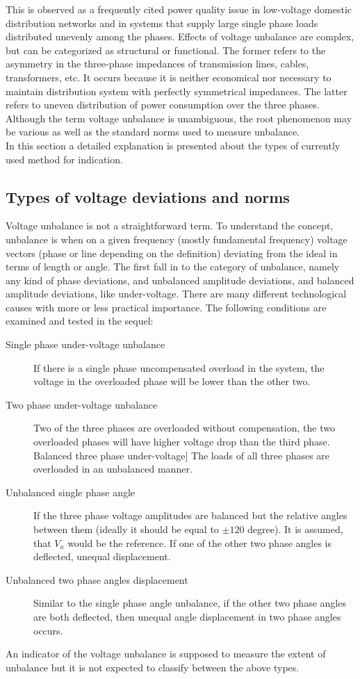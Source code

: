 	This is observed as a frequently cited power quality issue in low-voltage domestic distribution networks and in systems that supply large single phase loads distributed unevenly among the phases. Effects of voltage unbalance are complex, but can be categorized as structural or functional. The former refers to the asymmetry in the three-phase impedances of transmission lines, cables, transformers, etc. It occurs because it is neither economical nor necessary to maintain distribution system with perfectly symmetrical impedances. The latter refers to uneven distribution of power consumption over the three phases. Although the term voltage unbalance is unambiguous, the root phenomenon may be various as well as the standard norms used to measure unbalance.\\ 		
In this section a detailed explanation is presented about the types of currently used method for indication.
	
	\subsection{Types of voltage deviations and norms}\label{BASICUNB:sec:DefinitionsofUNB2}

        Voltage unbalance is not a straightforward term. To understand the concept, unbalance is when on a given frequency (mostly fundamental frequency) voltage vectors (phase or line depending on the definition) deviating from the ideal in terms of length or angle. The first fall in to the category of unbalance, namely any kind of phase deviations, and unbalanced amplitude deviations, and balanced amplitude deviations, like under-voltage. There are many different technological causes with more or less practical importance. The following conditions are examined and tested in the sequel:
        \begin{description}
        \item[Single phase under-voltage unbalance]  If there is a single phase uncompensated overload in the system, the voltage in the overloaded phase will be lower than the other two.
        \item[Two phase under-voltage unbalance]  Two of the three phases are overloaded without compensation, the two overloaded phases will have higher voltage drop than the third phase.
        Balanced three phase under-voltage]  The loads of all three phases are overloaded in an unbalanced manner.
        \item[Unbalanced single phase angle]  If the three phase voltage amplitudes are balanced but the relative angles between them (ideally it should be equal to $\pm120$ degree). It is assumed, that $V_a$ would be the reference. If one of the other two phase angles is deflected, unequal displacement.
        \item[Unbalanced two phase angles displacement] Similar to the single phase angle unbalance, if the other two phase angles are both deflected, then unequal angle displacement in two phase angles occurs.
        \end{description}
        An indicator of the voltage unbalance is supposed to measure the extent of unbalance but it is not expected to classify between the above types.
	
